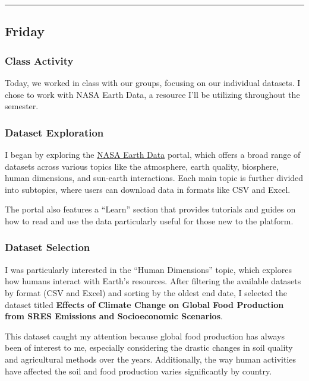 \documentclass[
  letterpaper,
  DIV=11,
  numbers=noendperiod]{scrreprt}
\begin{document}
\begin{center}\rule{0.5\linewidth}{0.5pt}\end{center}

\subsection{Friday}\label{friday-1}

\subsubsection{Class Activity}\label{class-activity}

Today, we worked in class with our groups, focusing on our individual
datasets. I chose to work with NASA Earth Data, a resource I'll be
utilizing throughout the semester.

\subsubsection{Dataset Exploration}\label{dataset-exploration}

I began by exploring the \href{https://www.earthdata.nasa.gov/}{NASA
Earth Data} portal, which offers a broad range of datasets across
various topics like the atmosphere, earth quality, biosphere, human
dimensions, and sun-earth interactions. Each main topic is further
divided into subtopics, where users can download data in formats like
CSV and Excel.

The portal also features a ``Learn'' section that provides tutorials and
guides on how to read and use the data particularly useful for those new
to the platform.

\subsubsection{Dataset Selection}\label{dataset-selection}

I was particularly interested in the ``Human Dimensions'' topic, which
explores how humans interact with Earth's resources. After filtering the
available datasets by format (CSV and Excel) and sorting by the oldest
end date, I selected the dataset titled \textbf{Effects of Climate
Change on Global Food Production from SRES Emissions and Socioeconomic
Scenarios}.

This dataset caught my attention because global food production has
always been of interest to me, especially considering the drastic
changes in soil quality and agricultural methods over the years.
Additionally, the way human activities have affected the soil and food
production varies significantly by country.
\end{document}

